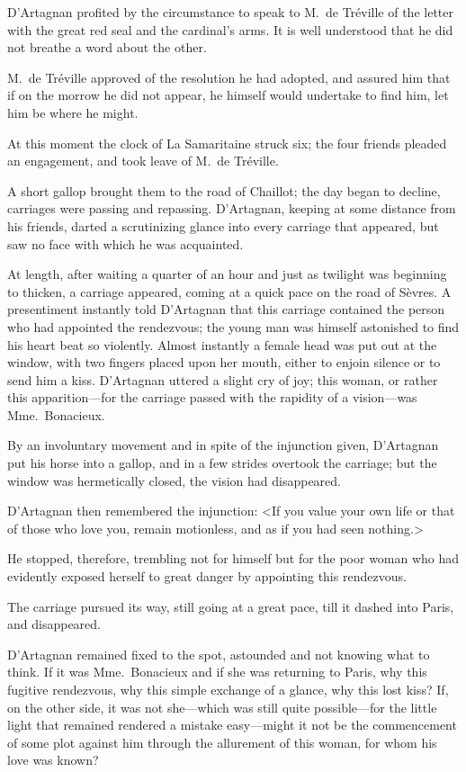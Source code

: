 D'Artagnan profited by the circumstance to speak to M.~de Tréville of the letter with the great red seal and the cardinal's arms. It is well understood that he did not breathe a word about the other. 

M.~de Tréville approved of the resolution he had adopted, and assured him that if on the morrow he did not appear, he himself would undertake to find him, let him be where he might. 

At this moment the clock of La Samaritaine struck six; the four friends pleaded an engagement, and took leave of M.~de Tréville. 

A short gallop brought them to the road of Chaillot; the day began to decline, carriages were passing and repassing. D'Artagnan, keeping at some distance from his friends, darted a scrutinizing glance into every carriage that appeared, but saw no face with which he was acquainted. 

At length, after waiting a quarter of an hour and just as twilight was beginning to thicken, a carriage appeared, coming at a quick pace on the road of Sèvres. A presentiment instantly told D'Artagnan that this carriage contained the person who had appointed the rendezvous; the young man was himself astonished to find his heart beat so violently. Almost instantly a female head was put out at the window, with two fingers placed upon her mouth, either to enjoin silence or to send him a kiss. D'Artagnan uttered a slight cry of joy; this woman, or rather this apparition—for the carriage passed with the rapidity of a vision—was Mme.~Bonacieux. 

By an involuntary movement and in spite of the injunction given, D'Artagnan put his horse into a gallop, and in a few strides overtook the carriage; but the window was hermetically closed, the vision had disappeared. 

D'Artagnan then remembered the injunction: <If you value your own life or that of those who love you, remain motionless, and as if you had seen nothing.> 

He stopped, therefore, trembling not for himself but for the poor woman who had evidently exposed herself to great danger by appointing this rendezvous. 

The carriage pursued its way, still going at a great pace, till it dashed into Paris, and disappeared. 

D'Artagnan remained fixed to the spot, astounded and not knowing what to think. If it was Mme.~Bonacieux and if she was returning to Paris, why this fugitive rendezvous, why this simple exchange of a glance, why this lost kiss? If, on the other side, it was not she—which was still quite possible—for the little light that remained rendered a mistake easy—might it not be the commencement of some plot against him through the allurement of this woman, for whom his love was known? 

